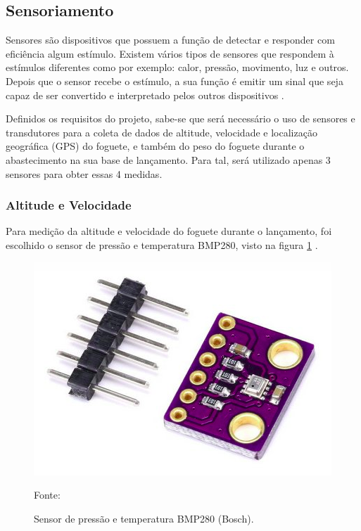 \subsection{Sensoriamento}

Sensores são dispositivos que possuem a função de detectar e responder com eficiência algum estímulo. Existem vários tipos de sensores que respondem à estímulos diferentes como por exemplo: calor, pressão, movimento, luz e outros. Depois que o sensor recebe o estímulo, a sua função é emitir um sinal que seja capaz de ser convertido e interpretado pelos outros dispositivos \cite{mattede_Sensores_blog2020}.

Definidos os requisitos do projeto, sabe-se que será necessário o uso de sensores e transdutores para a coleta de dados de altitude, velocidade e localização geográfica (GPS) do foguete, e também do peso do foguete durante o abastecimento na sua base de lançamento. Para tal, será utilizado apenas 3 sensores para obter essas 4 medidas.

\subsubsection{Altitude e Velocidade}

Para medição da altitude e velocidade do foguete durante o lançamento, foi escolhido o sensor de pressão e temperatura BMP280, visto na figura \ref{fig:sensor_pressao} \cite{datasheet_BMP280}.

\begin{figure}[H]
  \centering
  \includegraphics[scale=0.75]{figuras/BMP280.png}
  \caption{Sensor de pressão e temperatura BMP280 (Bosch). }
 { \footnotesize Fonte:\cite{figura_BMP280}} 
  \label{fig:sensor_pressao}
\end{figure}

